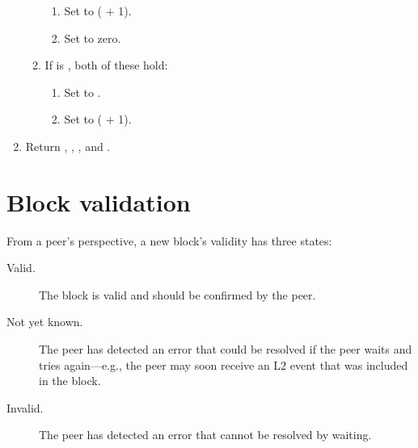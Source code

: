 \documentclass[../hydrozoa.tex]{subfiles}
\begin{document}
\begin{enumerate}
\begin{enumerate}
\begin{enumerate}
          \item Set  to ( + 1).
          \item Set  to zero.
        \end{enumerate}
      \item If  is , both of these hold:
        \begin{enumerate}
          \item Set  to .
          \item Set  to ( + 1).
        \end{enumerate}
    \end{enumerate}
  \item Return , , , and .
\end{enumerate}

\section{Block validation}%
\label{h:l2-block-validation}%

From a peer's perspective, a new block's validity has three states:
\begin{description}
  \item[Valid.] The block is valid and should be confirmed by the peer.
  \item[Not yet known.] The peer has detected an error that could be resolved if the peer waits and tries again---e.g., the peer may soon receive an L2 event that was included in the block.
  \item[Invalid.] The peer has detected an error that cannot be resolved by waiting.
\end{description}
\end{document}
